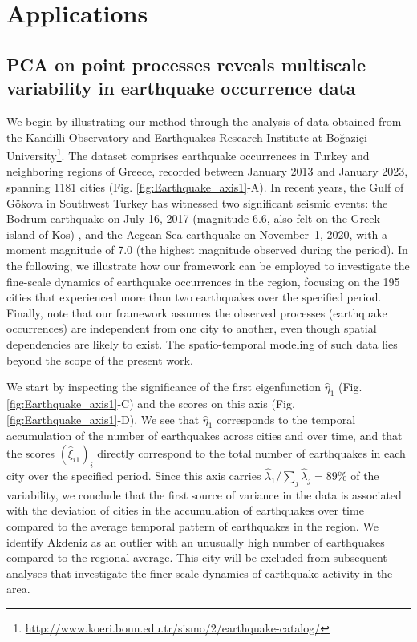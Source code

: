 \documentclass[aos]{imsart}
\theoremstyle{plain}
\theoremstyle{remark}
\newcommand{\1}{1}
\begin{document}
\section{Applications}\label{sec:applications}
\subsection{PCA on point processes reveals multiscale variability in earthquake occurrence data}
	
We begin by illustrating our method through the analysis of data obtained from the Kandilli Observatory and Earthquakes Research Institute at Bo\u{g}azi\c{c}i University\footnote{\url{http://www.koeri.boun.edu.tr/sismo/2/earthquake-catalog/}}. The dataset comprises earthquake occurrences in Turkey and neighboring regions of Greece, recorded between January 2013 and January 2023, spanning 1181 cities (Fig. \ref{fig:Earthquake_axis1}-A). In recent years, the Gulf of G\"{o}kova in Southwest Turkey has witnessed two significant seismic events: the Bodrum earthquake on July 16, 2017 (magnitude 6.6, also felt on the Greek island of Kos) \cite{Karasozen_etal_2018}, and the Aegean Sea earthquake on November~1, 2020, with a moment magnitude of 7.0 (the highest magnitude observed during the period).  In the following, we illustrate how our framework can be employed to investigate the fine-scale dynamics of earthquake occurrences in the region, focusing on the 195 cities that experienced more than two earthquakes over the specified period. Finally, note that our framework assumes the observed processes (earthquake occurrences) are independent from one city to another, even though spatial dependencies are likely to exist. The spatio-temporal modeling of such data lies beyond the scope of the present work.
	

We start by inspecting the significance of the first eigenfunction \(\widehat{\eta}_1\) (Fig. \ref{fig:Earthquake_axis1}-C) and the scores on this axis (Fig. \ref{fig:Earthquake_axis1}-D). We see that \(\widehat{\eta}_1\) corresponds to the temporal accumulation of the number of earthquakes across cities and over time, and that the scores \((\widehat{\xi}_{i1})_i\) directly correspond to the total number of earthquakes in each city over the specified period. Since this axis carries $\widehat{\lambda}_1/\sum_j \widehat{\lambda}_j = 89\%$ of the variability, we conclude that the first source of variance in the data is associated with the deviation of cities in the accumulation of earthquakes over time compared to the average temporal pattern of earthquakes in the region. We identify Akdeniz as an outlier with an unusually high number of earthquakes compared to the regional average. This city will be excluded from subsequent analyses that investigate the finer-scale dynamics of earthquake activity in the area.
 
\end{document}
